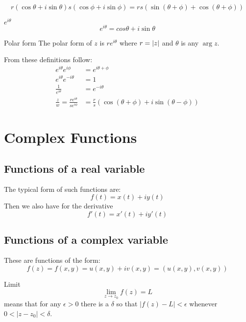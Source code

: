 \documentclass{amsbook}
\begin{document}
\begin{equation}
r (\cos\theta + i\sin\theta) s (\cos\phi + i\sin\phi) = rs(\sin(\theta + \phi) + \cos(\theta + \phi))
\end{equation}

\begin{mydef}{$e^{i\theta}$}
\begin{equation}
e^{i\theta} = cos\theta + i\sin\theta
\end{equation}
\end{mydef}

\newcommand{\polar}[2]{#1e^{i#2}}
\begin{mydef}{Polar form} 
The polar form of $z$ is $\polar r \theta$ where $r = \left| z \right|$ and $\theta$ is any $\arg z$.
\end{mydef}

From these definitions follow:
\begin{align}
\polar {}{\theta} \polar{}{\phi} &= \polar {} {\theta + \phi} \\
e^{i\theta} e^{-i\theta} &= 1 \\
\frac{1}{e^{i\theta}} &= e^{-i\theta} \\
\frac{z}{w} = \frac{\polar r \theta} {\polar s \phi} &= \frac {r}{s} (\cos(\theta + \phi) + i \sin (\theta - \phi)) 
\end{align}
\chapter{Complex Functions}
\section{Functions of a real variable}

The typical form of such functions are:
\[ f(t) = x(t) + i y(t) \]
Then we also have for the derivative
\[ f'(t) = x'(t) + i y'(t) \]
\section{Functions of a complex variable}
These are functions of the form:
\[ f(z) = f(x,y) = u(x,y) + iv(x,y) = (u(x,y),v(x,y)) \]

\newcommand{\limit}[2]{\lim_{{#1} \to #2}}
\begin{mydef}{Limit}
\[\limit{z}{z_0} f(z) = L \]
means that for any $\epsilon > 0$ there is a $\delta$ so that $|f(z)-L| < \epsilon$ whenever $0 < |z - z_0| < \delta$.
\end{mydef}
\end{document}
